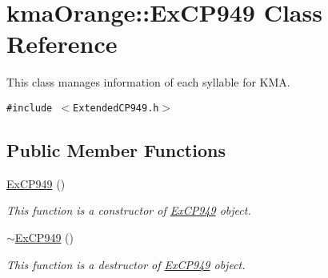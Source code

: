 \hypertarget{classkmaOrange_1_1ExCP949}{
\section{kmaOrange::ExCP949 Class Reference}
\label{classkmaOrange_1_1ExCP949}
}
This class manages information of each syllable for KMA.  


{\tt \#include $<$ExtendedCP949.h$>$}

\subsection*{Public Member Functions}
\begin{CompactItemize}
\item 
\hyperlink{classkmaOrange_1_1ExCP949_1ed1dd58587eef4c1561c1689efdfedd}{ExCP949} ()
\begin{CompactList}\small\item\em This function is a constructor of \hyperlink{classkmaOrange_1_1ExCP949}{ExCP949} object. \item\end{CompactList}\item 
\hyperlink{classkmaOrange_1_1ExCP949_10256a72aecc859bd7572082ba5059fa}{$\sim$ExCP949} ()
\begin{CompactList}\small\item\em This function is a destructor of \hyperlink{classkmaOrange_1_1ExCP949}{ExCP949} object. \item\end{CompactList}\end{CompactItemize}
